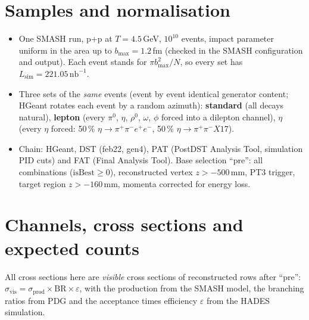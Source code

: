 \documentclass[11pt,a4paper]{article}
\newcommand{\piz}{\ensuremath{\pi^{0}}\xspace}
\newcommand{\pipi}{\ensuremath{\pi^{+}\pi^{-}}\xspace}
\newcommand{\ppee}{\ensuremath{\pi^{+}\pi^{-}e^{+}e^{-}}\xspace}
\newcommand{\nbinv}{\ensuremath{\mathrm{nb}^{-1}}\xspace}
\newcommand{\Lsim}{\ensuremath{L_{\mathrm{sim}}}\xspace}
\begin{document}
\section{Samples and normalisation}
\begin{itemize}
\item One SMASH run, p+p at $T = 4.5$\,GeV, $10^{10}$ events, impact parameter uniform in the area up to
      $b_{\max} = 1.2$\,fm (checked in the SMASH configuration and output). Each event stands for
      $\pi b_{\max}^2/N$, so every set has $\Lsim = 221.05\,\nbinv$.
\item Three sets of the \emph{same} events (event by event identical generator content; HGeant rotates
      each event by a random azimuth): \textbf{standard} (all decays natural), \textbf{lepton} (every
      \piz, $\eta$, $\rho^0$, $\omega$, $\phi$ forced into a dilepton channel), \textbf{$\eta$} (every $\eta$
      forced: 50\,\% $\eta\to\ppee$, 50\,\% $\eta\to\pipi X17$).
\item Chain: HGeant, DST (feb22, gen4), PAT (PostDST Analysis Tool, simulation PID cuts) and FAT (Final
      Analysis Tool). Base selection ``pre'': all combinations ($\mathrm{isBest}\ge0$), reconstructed
      vertex $z>-500$\,mm, PT3 trigger, target region $z>-160$\,mm, momenta corrected for energy loss.
\end{itemize}

\section{Channels, cross sections and expected counts}
All cross sections here are \emph{visible} cross sections of reconstructed rows after ``pre'':
$\sigma_{\mathrm{vis}} = \sigma_{\mathrm{prod}}\times\mathrm{BR}\times\varepsilon$, with the production from the
SMASH model, the branching ratios from PDG and the acceptance times efficiency $\varepsilon$ from the HADES
simulation.
\end{document}

